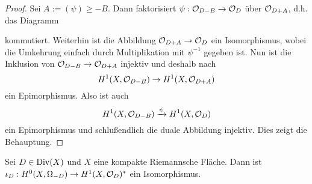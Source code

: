 \begin{proof}
  Sei $A := (\psi) \geq -B$. Dann faktorisiert $\psi: \mathcal{O}_{D-B} \rightarrow
  \mathcal{O}_D$ über $\mathcal{O}_{D+A}$, d.h. das Diagramm
  \begin{center}
  \end{center}
  kommutiert. Weiterhin ist die Abbildung $\mathcal{O}_{D+A} \rightarrow \mathcal{O}_D$ ein
  Isomorphismus, wobei die Umkehrung einfach durch Multiplikation mit
  $\psi^{-1}$ gegeben ist. Nun ist die Inklusion von $\mathcal{O}_{D-B} \rightarrow
  \mathcal{O}_{D+A}$ injektiv und deshalb nach \cite[Satz 16.8]{For}
  \[
  H^1(X, \mathcal{O}_{D-B}) \rightarrow H^1(X, \mathcal{O}_{D+A})
  \]
  ein Epimorphismus. Also ist auch
  \[
  H^1(X,\mathcal{O}_{D-B}) \xrightarrow{\psi} H^1(X, \mathcal{O}_D)
  \]
  ein Epimorphismus und schlußendlich die duale Abbildung
  injektiv. Dies zeigt die Behauptung.
\end{proof}

\begin{thm}
  \label{thm:serre}
  Sei $D \in \operatorname{Div}(X)$ und $X$ eine kompakte Riemannsche Fläche. Dann
  ist $\iota_D: H^0(X, \Omega_{-D}) \rightarrow H^1(X, \mathcal{O}_D)^\ast$ ein Isomorphismus.
\end{thm}

